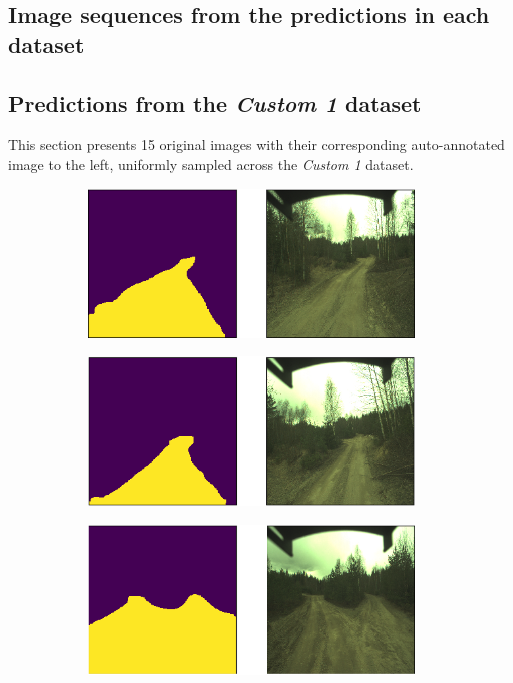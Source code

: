 \documentclass[USenglish]{ifimaster}  %
\begin{document}
\printbibliography
\begin{appendices}
\chapter{Image sequences from the predictions in each dataset}\label{appendix}

\section{Predictions from the \textit{Custom 1} dataset}\label{appendix_1}
This section presents 15 original images with their corresponding auto-annotated image to the left, uniformly sampled across the \textit{Custom 1} dataset.

\begin{figure}[ht]
\centering
\begin{subfigure}[b]{\textwidth}
\centering
\includegraphics[width=0.95\textwidth]{bilder/appendix_1/2017-05-09-13-26-47-00002.png}
\end{subfigure}
\hfill
\begin{subfigure}[b]{\textwidth}
\centering
\includegraphics[width=0.95\textwidth]{bilder/appendix_1/2017-05-09-13-26-47-00032.png}
\end{subfigure}
\hfill
\begin{subfigure}[b]{\textwidth}
\centering
\includegraphics[width=0.95\textwidth]{bilder/appendix_1/2017-05-09-13-26-47-00058.png}

\end{subfigure}
\end{figure}
\end{appendices}
\end{document}
